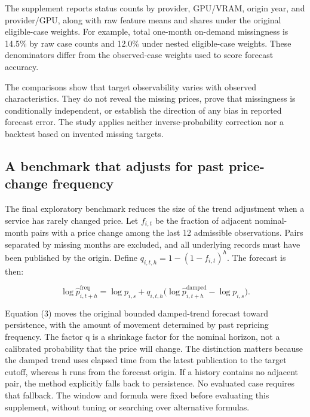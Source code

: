 \documentclass[10pt]{article}
\begin{document}
The supplement reports status counts by provider, GPU/VRAM, origin year, and provider/GPU, along with raw feature means and shares under the original eligible-case weights. For example, total one-month on-demand missingness is 14.5\% by raw case counts and 12.0\% under nested eligible-case weights. These denominators differ from the observed-case weights used to score forecast accuracy.

The comparisons show that target observability varies with observed characteristics. They do not reveal the missing prices, prove that missingness is conditionally independent, or establish the direction of any bias in reported forecast error. The study applies neither inverse-probability correction nor a backtest based on invented missing targets.

\subsection{A benchmark that adjusts for past price-change frequency}

The final exploratory benchmark reduces the size of the trend adjustment when a service has rarely changed price. Let $f_{i,t}$ be the fraction of adjacent nominal-month pairs with a price change among the last 12 admissible observations. Pairs separated by missing months are excluded, and all underlying records must have been published by the origin. Define $q_{i,t,h}=1-(1-f_{i,t})^h$. The forecast is then:

\begin{equation}
\log\widehat p^{\mathrm{freq}}_{i,t+h}
=\log p_{i,s}+q_{i,t,h}\bigl(\log\widehat p^{\mathrm{damped}}_{i,t+h}-\log p_{i,s}\bigr).
\end{equation}

Equation (3) moves the original bounded damped-trend forecast toward persistence, with the amount of movement determined by past repricing frequency. The factor q is a shrinkage factor for the nominal horizon, not a calibrated probability that the price will change. The distinction matters because the damped trend uses elapsed time from the latest publication to the target cutoff, whereas h runs from the forecast origin. If a history contains no adjacent pair, the method explicitly falls back to persistence. No evaluated case requires that fallback. The window and formula were fixed before evaluating this supplement, without tuning or searching over alternative formulas.

\begin{table}[H]
\centering\small

\caption{Exploratory frequency-shrunk benchmark on the original primary observed cases. Excess error is the relative MALE increase over persistence. It is calculated from unrounded scores, before formatting the displayed values. The original five-method experiment is unchanged.}
\label{tab:table9}
\end{table}
\end{document}
